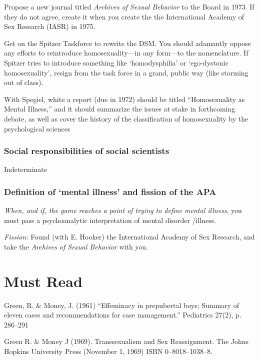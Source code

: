 \begin{refsection}
Propose a new journal titled \emph{Archives of Sexual Behavior} to the Board in 1973. If they do not agree, create it when you create the the International Academy of Sex Research (IASR) in 1975.

Get on the Spitzer Taskforce to rewrite the DSM. You should adamantly oppose any efforts to reintroduce homosexuality—in any form—to the nomenclature. If Spitzer tries to introduce something like `homodysphilia' or `ego-dystonic homosexuality', resign from the task force in a grand, public way (like storming out of class).

\begin{writingtask}[Green]\label{writingtask:green}
With Spegiel, white a report (due in 1972) should be titled “Homosexuality as Mental Illness,” and it should summarize the issues at stake in forthcoming debate, as well as cover the history of the classification of homosexuality by the psychological sciences
\end{writingtask}

\subsubsection{Social responsibilities of social scientists}
\label{socialresponsibilitiesofsocialscientists}

Indeterminate

\subsubsection{Definition of ‘mental illness’ and fission of the APA}
\label{definitionof‘mentalillness’andfissionoftheapa}

\emph{When, and if, the game reaches a point of trying to define mental illness}, you must pass a psychoanalytic interpretation of mental disorder \slash  illness.

\emph{Fission:} Found (with E. Hooker) the International Academy of Sex Research, and take the \emph{Archives of Sexual Behavior} with you.

\section{Must Read}
\label{mustread}

Green, R. \& Money, J. (1961) “Effeminacy in prepubertal boys; Summary of eleven cases and recommendations for case management.” Pediatrics 27(2), p. 286--291

Green R. \& Money J (1969). Transsexualism and Sex Reassignment. The Johns Hopkins University Press (November 1, 1969) ISBN 0--8018--1038--8.


\end{refsection}

